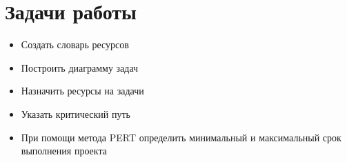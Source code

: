 \section{Задачи работы}
\begin{itemize}
\item Создать словарь ресурсов
\item Построить диаграмму задач
\item Назначить ресурсы на задачи
\item Указать критический путь
\item При помощи метода PERT определить минимальный и максимальный срок выполнения проекта
\end{itemize}
